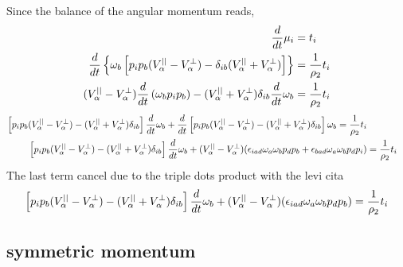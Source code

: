 Since the balance of the angular momentum reads, 
\begin{align*}
    \frac{d}{d t} \mu_i
    &= t_i \\
    \frac{d}{d t} \left\{
       \omega_b \left[
            p_ip_b (V_\alpha^{||} - V_\alpha^\bot) 
           - \delta_{ib} (V_\alpha^{||} + V_\alpha^\bot)
       \right]
    \right\}
    &= \frac{1}{\rho_2}t_i \\
    (V_\alpha^{||} - V_\alpha^\bot) \frac{d}{d t} \left(
       \omega_b
            p_ip_b 
       \right)
    - (V_\alpha^{||} + V_\alpha^\bot) \delta_{ib}\frac{d}{d t} 
       \omega_b 
    &= \frac{1}{\rho_2}t_i 
\end{align*}
\begin{align*}
    \left[
        p_ip_b  (V_\alpha^{||} - V_\alpha^\bot) 
        - (V_\alpha^{||} + V_\alpha^\bot)\delta_{ib}
    \right]\frac{d}{d t} 
       \omega_b
    + \frac{d}{d t} \left[
        p_ip_b  (V_\alpha^{||} - V_\alpha^\bot) 
        - (V_\alpha^{||} + V_\alpha^\bot)\delta_{ib}
    \right] 
       \omega_b
    = \frac{1}{\rho_2}t_i \\
    \left[
        p_ip_b  (V_\alpha^{||} - V_\alpha^\bot) 
        - (V_\alpha^{||} + V_\alpha^\bot)\delta_{ib}
    \right]\frac{d}{d t}
       \omega_b
    +(V_\alpha^{||} - V_\alpha^\bot) (\epsilon_{iad} \omega_a 
    \omega_b
    p_dp_b 
    +  \epsilon_{bad} \omega_a 
    \omega_b
    p_dp_i ) 
    &= \frac{1}{\rho_2}t_i \\
\end{align*}
The last term cancel due to the triple dots product with the levi cita 
\begin{align*}
    \left[
        p_ip_b  (V_\alpha^{||} - V_\alpha^\bot) 
        - (V_\alpha^{||} + V_\alpha^\bot)\delta_{ib}
    \right]\frac{d}{d t}
       \omega_b
    +(V_\alpha^{||} - V_\alpha^\bot) (\epsilon_{iad} \omega_a 
    \omega_b
    p_dp_b) 
    &= \frac{1}{\rho_2}t_i \\
\end{align*}



\subsection{symmetric momentum}

